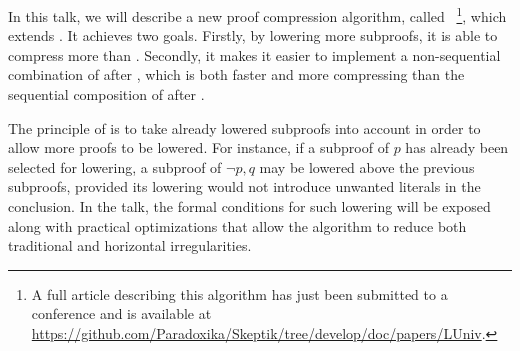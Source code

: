 \documentclass{easychair}
\begin{document}
In this talk, we will describe a new proof compression algorithm, called \LowerUnivalents~\footnote{A full article describing
this algorithm has just been submitted to a conference and is available at \url{https://github.com/Paradoxika/Skeptik/tree/develop/doc/papers/LUniv}.}, which extends \LowerUnits. It achieves two goals. Firstly, by lowering
more subproofs, it is able to compress more than \LowerUnits. Secondly, it makes it easier to implement a non-sequential combination of \LowerUnivalents after
\RecyclePivotsIntersection, which is both faster and more
compressing than the sequential composition of \LowerUnits after \RecyclePivotsIntersection.

The principle of \LowerUnivalents is to take already lowered subproofs into account in order to
allow more proofs to be lowered. For instance, if a subproof of $p$ has already been selected for
lowering, a subproof of $\neg p, q$ may be lowered above the previous subproofs, provided its
lowering would not introduce unwanted literals in the conclusion. In the talk, the formal conditions for such
lowering will be exposed along with practical optimizations that allow the algorithm to reduce both
traditional and horizontal irregularities.




\end{document}
